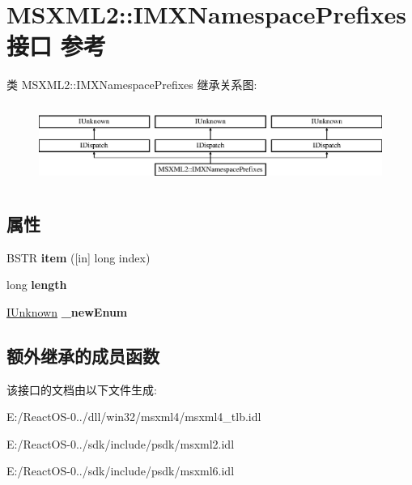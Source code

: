 \hypertarget{interface_m_s_x_m_l2_1_1_i_m_x_namespace_prefixes}{}\section{M\+S\+X\+M\+L2\+:\+:I\+M\+X\+Namespace\+Prefixes接口 参考}
\label{interface_m_s_x_m_l2_1_1_i_m_x_namespace_prefixes}
类 M\+S\+X\+M\+L2\+:\+:I\+M\+X\+Namespace\+Prefixes 继承关系图\+:\begin{figure}[H]
\begin{center}
\leavevmode
\includegraphics[height=2.616822cm]{interface_m_s_x_m_l2_1_1_i_m_x_namespace_prefixes}
\end{center}
\end{figure}
\subsection*{属性}
\begin{DoxyCompactItemize}
\item 
\mbox{\label{interface_m_s_x_m_l2_1_1_i_m_x_namespace_prefixes_a7f34364d3d38e1c71bb244e17e29a9ce}} 
B\+S\+TR {\bfseries item} (\mbox{[}in\mbox{]} long index)
\item 
\mbox{\label{interface_m_s_x_m_l2_1_1_i_m_x_namespace_prefixes_a5751d30e6c5475776a53c4f1f4ad68e2}} 
long {\bfseries length}
\item 
\mbox{\label{interface_m_s_x_m_l2_1_1_i_m_x_namespace_prefixes_a3ddfd2e2e9316bc81733828ecfcb7aae}} 
\hyperlink{interface_i_unknown}{I\+Unknown} {\bfseries \+\_\+new\+Enum}
\end{DoxyCompactItemize}
\subsection*{额外继承的成员函数}


该接口的文档由以下文件生成\+:\begin{DoxyCompactItemize}
\item 
E\+:/\+React\+O\+S-\/0../dll/win32/msxml4/msxml4\+\_\+tlb.\+idl\item 
E\+:/\+React\+O\+S-\/0../sdk/include/psdk/msxml2.\+idl\item 
E\+:/\+React\+O\+S-\/0../sdk/include/psdk/msxml6.\+idl\end{DoxyCompactItemize}
